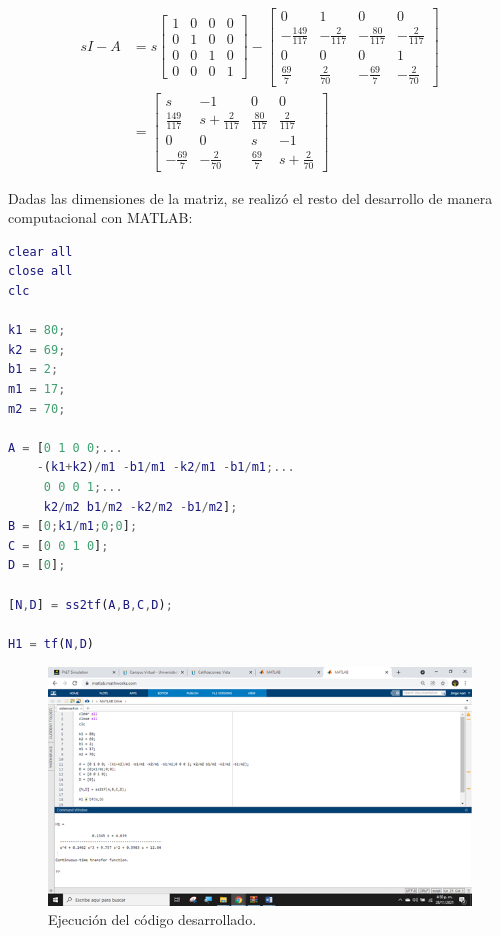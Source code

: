 \documentclass{article}
\begin{document}
\begin{enumerate}
\begin{align}
  sI-A &= s
  \begin{bmatrix}
    1 & 0 & 0 & 0\\
    0 & 1 & 0 & 0\\
    0 & 0 & 1 & 0\\
    0 & 0 & 0 & 1 
  \end{bmatrix}
  -
  \begin{bmatrix}
    0 & 1 & 0 & 0\\
    -\frac{149}{117} & -\frac{2}{117} & -\frac{80}{117} & -\frac{2}{117}\\
    0 & 0 & 0 & 1\\
    \frac{69}{7} & \frac{2}{70} & -\frac{69}{7} & -\frac{2}{70}
  \end{bmatrix}\\
  &=
  \begin{bmatrix}
    s & -1 & 0 & 0\\
    \frac{149}{117} & s+\frac{2}{117} & \frac{80}{117} & \frac{2}{117}\\
    0 & 0 & s & -1\\
    -\frac{69}{7} & -\frac{2}{70} & \frac{69}{7} & s+\frac{2}{70}
  \end{bmatrix}
\end{align}

Dadas las dimensiones de la matriz, se realizó el resto del desarrollo de manera computacional con MATLAB:

\begin{lstlisting}[language=matlab]
clear all
close all
clc
 
k1 = 80;
k2 = 69;
b1 = 2;
m1 = 17;
m2 = 70;
 
A = [0 1 0 0;...
    -(k1+k2)/m1 -b1/m1 -k2/m1 -b1/m1;...
     0 0 0 1;...
     k2/m2 b1/m2 -k2/m2 -b1/m2];
B = [0;k1/m1;0;0];
C = [0 0 1 0];
D = [0];
 
[N,D] = ss2tf(A,B,C,D);
 
H1 = tf(N,D)
\end{lstlisting}

\begin{figure}
  \centering
  \includegraphics[width=15cm]{img/codigo.png}
  \caption{Ejecución del código desarrollado.}
\end{figure}


\end{enumerate}
\end{document}
